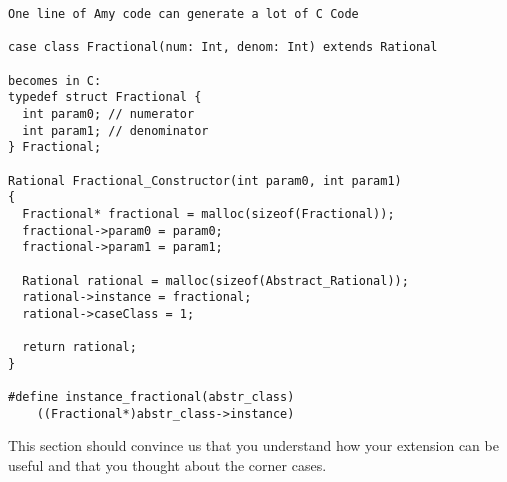 \begin{lstlisting}
One line of Amy code can generate a lot of C Code

case class Fractional(num: Int, denom: Int) extends Rational

becomes in C:
typedef struct Fractional {
  int param0; // numerator
  int param1; // denominator
} Fractional;

Rational Fractional_Constructor(int param0, int param1) 
{
  Fractional* fractional = malloc(sizeof(Fractional));
  fractional->param0 = param0;
  fractional->param1 = param1;

  Rational rational = malloc(sizeof(Abstract_Rational));
  rational->instance = fractional;
  rational->caseClass = 1;

  return rational;
}

#define instance_fractional(abstr_class)
	((Fractional*)abstr_class->instance)

\end{lstlisting}
This section should convince us that you understand how your extension can be
useful and that you thought about the corner cases.
